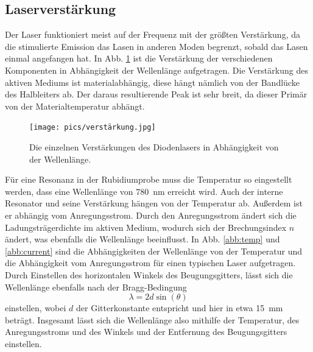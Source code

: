 \subsection{Laserverstärkung}

Der Laser funktioniert meist auf der Frequenz mit der größten Verstärkung, da die stimulierte Emission das Lasen in anderen Moden begrenzt, sobald das Lasen einmal angefangen hat.
In Abb. \ref{abb:verstärker} ist die Verstärkung der verschiedenen Komponenten in Abhängigkeit der Wellenlänge aufgetragen. Die Verstärkung des aktiven Mediums ist materialabhängig, diese hängt nämlich von der Bandlücke des Halbleiters ab. Der daraus resultierende Peak ist sehr breit, da dieser Primär von der Materialtemperatur abhängt.

\begin{figure}
    \centering
    \texttt{[image: pics/verstärkung.jpg]}
    \caption{Die einzelnen Verstärkungen des Diodenlasers in Abhängigkeit von der Wellenlänge. \cite{anleitung}}
    \label{abb:verstärker}
\end{figure}

Für eine Resonanz in der Rubidiumprobe muss die Temperatur so eingestellt werden, dass eine Wellenlänge von \SI{780}{\nm} erreicht wird. Auch der interne Resonator und seine Verstärkung hängen von der Temperatur ab. Außerdem ist er abhängig vom Anregungsstrom. Durch den Anregungsstrom ändert sich die Ladungsträgerdichte im aktiven Medium, wodurch sich der Brechungsindex $n$ ändert, was ebenfalls die Wellenlänge beeinflusst. In Abb. \ref{abb:temp} und \ref{abb:current} sind die Abhängigkeiten der Wellenlänge von der Temperatur und die Abhängigkeit vom Anregungsstrom für einen typischen Laser aufgetragen. Durch Einstellen des horizontalen Winkels des Beugungsgitters, lässt sich die Wellenlänge ebenfalls  nach der Bragg-Bedingung
\begin{equation*}
    \lambda = 2d \sin(\theta)
\end{equation*}
einstellen, wobei $d$ der Gitterkonstante entspricht und hier in etwa \SI{15}{\mm} beträgt. Insgesamt lässt sich die Wellenlänge also mithilfe der Temperatur, des Anregungsstroms und des Winkels und der Entfernung des Beugungsgitters einstellen.


